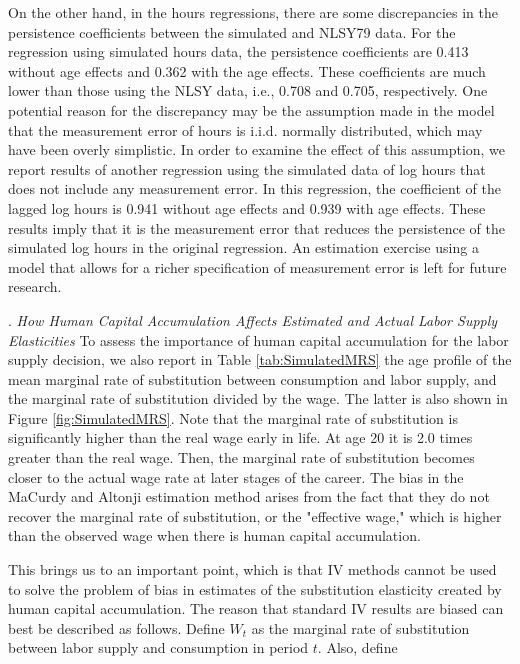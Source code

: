 \documentclass{article}
\begin{document}
      On the other hand, in the hours regressions, there are some discrepancies in the persistence coefficients between the simulated and NLSY79 data. For the  regression using simulated hours data, the persistence coefficients are 0.413 without age effects and 0.362 with the age effects. These coefficients are much lower than those using the NLSY data, i.e., 0.708 and 0.705, respectively. One potential reason for the discrepancy may be the assumption made in the model that the measurement error of hours is i.i.d. normally distributed, which may have been overly simplistic. In order to examine the effect of this assumption, we report results of another regression using the simulated data of log hours that does not include any measurement error. In this regression, the coefficient of the lagged log hours is 0.941 without age effects and 0.939 with age effects. These results imply that it is the measurement error that reduces the persistence of the simulated log hours in the original regression. An estimation exercise using a model that allows for a richer specification of measurement error is left for future research. \par
{}.     \textit{How Human Capital Accumulation Affects Estimated and Actual Labor Supply Elasticities}     To assess the importance of human capital accumulation for the labor supply decision, we also report in Table \ref{tab:SimulatedMRS} the age profile of the mean marginal rate of substitution between consumption and labor supply, and the marginal rate of substitution divided by the wage. The latter is also shown in Figure \ref{fig:SimulatedMRS}. Note that the marginal rate of substitution is significantly higher than the real wage early in life. At age 20 it is 2.0 times greater than the real wage. Then, the marginal rate of substitution becomes closer to the actual wage rate at later stages of the career. The bias in the MaCurdy and Altonji estimation method arises from the fact that they do not recover the marginal rate of substitution, or the "effective wage," which is higher than the observed wage when there is human capital accumulation. \par
     
      
      This brings us to an important point, which is that IV methods cannot be used to solve the problem of bias in estimates of the substitution elasticity created by human capital accumulation. The reason that standard IV results are biased can best be described as follows. Define $W_t$ as the marginal rate of substitution between labor supply and consumption in period $t$. Also, define
\end{document}
